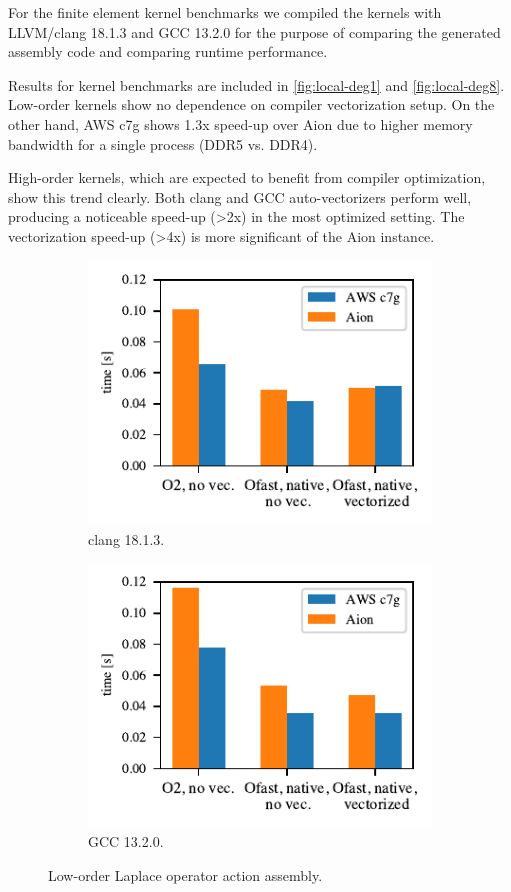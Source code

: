 For the finite element kernel benchmarks we compiled the kernels with
LLVM/clang 18.1.3 and GCC 13.2.0 for the purpose of comparing the generated
assembly code and comparing runtime performance.

Results for kernel benchmarks are included in \autoref{fig:local-deg1} and
\autoref{fig:local-deg8}. Low-order kernels show no dependence on compiler
vectorization setup. On the other hand, AWS c7g shows 1.3x speed-up over
Aion due to higher memory bandwidth for a single process (DDR5 vs. DDR4).

High-order kernels, which are expected to benefit from compiler optimization,
show this trend clearly. Both clang and GCC auto-vectorizers perform well,
producing a noticeable speed-up (\textgreater 2x) in the most optimized setting. The
vectorization speed-up (\textgreater 4x) is more significant of the Aion instance.

\begin{figure}
    \begin{subfigure}{.5\textwidth}
        \centering
        \includegraphics{chapters/chp1/graphics/kernel_plots/local_operator_clang_deg1.pdf}
        \caption{clang 18.1.3.}
        \label{fig:local-clang-deg1}
    \end{subfigure}%
    \begin{subfigure}{.5\textwidth}
        \centering
        \includegraphics{chapters/chp1/graphics/kernel_plots/local_operator_gcc_deg1.pdf}
        \caption{GCC 13.2.0.}
        \label{fig:local-gcc-deg1}
    \end{subfigure}
    \caption{Low-order Laplace operator action assembly.}
    \label{fig:local-deg1}
\end{figure}

